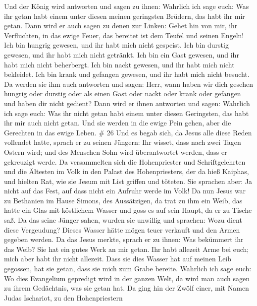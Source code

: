 Und der König wird antworten und sagen zu ihnen: Wahrlich ich sage euch:
Was ihr getan habt einem unter diesen meinen geringsten Brüdern, das
habt ihr mir getan.  Dann wird er auch sagen zu denen zur
Linken: Gehet hin von mir, ihr Verfluchten, in das ewige Feuer, das
bereitet ist dem Teufel und seinen Engeln!  Ich bin hungrig
gewesen, und ihr habt mich nicht gespeist. Ich bin durstig gewesen, und
ihr habt mich nicht getränkt.  Ich bin ein Gast gewesen,
und ihr habt mich nicht beherbergt. Ich bin nackt gewesen, und ihr habt
mich nicht bekleidet. Ich bin krank und gefangen gewesen, und ihr habt
mich nicht besucht.  Da werden sie ihm auch antworten und
sagen: Herr, wann haben wir dich gesehen hungrig oder durstig oder als
einen Gast oder nackt oder krank oder gefangen und haben dir nicht
gedient?  Dann wird er ihnen antworten und sagen: Wahrlich
ich sage euch: Was ihr nicht getan habt einem unter diesen Geringsten,
das habt ihr mir auch nicht getan.  Und sie werden in die
ewige Pein gehen, aber die Gerechten in das ewige Leben. \# 26
 Und es begab sich, da Jesus alle diese Reden vollendet
hatte, sprach er zu seinen Jüngern:  Ihr wisset, dass nach
zwei Tagen Ostern wird; und des Menschen Sohn wird überantwortet werden,
dass er gekreuzigt werde.  Da versammelten sich die
Hohenpriester und Schriftgelehrten und die Ältesten im Volk in den
Palast des Hohenpriesters, der da hieß Kaiphas,  und hielten
Rat, wie sie Jesum mit List griffen und töteten.  Sie
sprachen aber: Ja nicht auf das Fest, auf dass nicht ein Aufruhr werde
im Volk!  Da nun Jesus war zu Bethanien im Hause Simons, des
Aussätzigen,  da trat zu ihm ein Weib, das hatte ein Glas
mit köstlichem Wasser und goss es auf sein Haupt, da er zu Tische saß.
 Da das seine Jünger sahen, wurden sie unwillig und
sprachen: Wozu dient diese Vergeudung?  Dieses Wasser hätte
mögen teuer verkauft und den Armen gegeben werden.  Da das
Jesus merkte, sprach er zu ihnen: Was bekümmert ihr das Weib? Sie hat
ein gutes Werk an mir getan.  Ihr habt allezeit Arme bei
euch; mich aber habt ihr nicht allezeit.  Dass sie dies
Wasser hat auf meinen Leib gegossen, hat sie getan, dass sie mich zum
Grabe bereite.  Wahrlich ich sage euch: Wo dies Evangelium
gepredigt wird in der ganzen Welt, da wird man auch sagen zu ihrem
Gedächtnis, was sie getan hat.  Da ging hin der Zwölf
einer, mit Namen Judas Ischariot, zu den Hohenpriestern 
